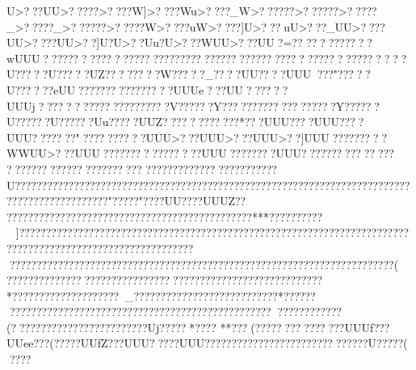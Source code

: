 {{{{{{{{{{{{{{{{{{{{{{{{{{{{{{{{{{{{{{{{{{{{{{{{{{{{{{{{{{{{{{{{{{{{{{{{{{{{{{{{{{{{{{{{{{{{{{{{{{{{{{{{{{{{{{{{{{{{{{{{{{{{{{{{{{{{{{{{{{{{{{{{{{{{{{{{{{{{{{{{{{{{{{{{{{{{{{{{{{{{{{{{{{{{{{{{{{{{{{{{{{{{{{{{{{{{{{{{{{{{{{{{{{{{{{{{{{{{{{{{{{{{{{{{{{{{{{{{{{{{{{{{{{{{{{{{{{{{{{{{{{{{{{{{{{{{{{{{{{{{{{{{{{{{{{{{{{{{{{{{{{{{{{{{{{{{{{{{{{{{{{{{{{{{{{{{{{{{{{{{{{{{{{{{{{{{{{{{{{{{{{{{{{{{{{{{{{{{{{{{{{{{{{{{{{{{{{{{{{{{{{{{{{{{{{{{{{{{{{{{{{{{{{{{{{{{{{{{{{{{{{{{{{{{{{{{{{{{{{{{{{{{{{{{{{{{{{{{{{{{{{{{{{{{{{{{{{{{{{{{{{{{{{{{{{{{{{{{{{{{{{{{{{{{{{{{{{{{{{{{{{{{{{{{{{{{{{{{{{{{{{{{{{{{{{{{{{{{{{{{{{{{{{{{{{{{{{{{{{{{{{{{{{{{{{{{{{{{{{{{{{{{{{{{{{{{{{{{{{{{{{{{{{{{{{{{{{{{{{{{{{{{{{{{{{{{{{{{{{{{{{{{{{{{{{{{{{{{{{{{{{{{{{{{{{{{{{{{{{{{{{{{{{{{{{{{{{{{{{{{{{{{{{{{{{{{{{{{{{{{{{{{{{{{{{{{{{{{{{{{{{{{{{{{{{{{{{{{{{{{{{{{{{{{{{{{{{{{{{{{{{{{{{{{{{{{{{{{{{{{{{{{{{{{{{{{{{{{{{{{{{{{{{{{{{{{{{{{{{{{{{{{{{{{{{{{{{{{{{{{{{{{{{{{{{{{{{{{{{{{{{{{{{{{{{{{{{{{{{{{{{{{{{{{{{{{{{{{{{{{{{{{{{{{{{{{{{{{{{{{{{{{{{{{{{{{{{{{{{{{{{{{{{{{{{{{{{{{{{{{{{{{{{{{{{{{{{{{{{{{{{{{{{{{{{{{{{{{{{{{{{{{{{{{{{{{{{{{{{{{{{{{{{{{{{{{{{{{{{{{{{{{{{{{{{{{{{{{{{{{{{{{{{{{{{{{{{{{{{{{{{{{{{{{{{{{{{{{{{{{{{{{{{{{{{{{{{{{{{{{{{{{{{{{{{{{{{{{{{{{{{{{{{{{{{{{{{{{{{{{{{{{{{{{{{{{{{{{{{{{{{{{{{{{{{{{{{{{{{{{{{{{{{{{{{{{{{{{{{{{{{{{{{{{{{{{{{{{{{{{{{{{{{{{{{{{{{{{{{{{{{{{{{{{{{{{{{{{{{{{{{{{{{{{{{{{{{{{{{{{{{{{{{{{{{{{{{{{{{{{{{{{{{{{{{{{{{{{{{{{{{{{{{{{{{{{{{{{{{{{{{{{{{{{{{{{{{{{{{{{{{{{{{{{{{{{{{{{{{{{{{{{{{{{{{{{{{{{{{{{{{{{{{{{{{{{{{{{{{{{{{{{{{{{{{{{{{{{{{{{{{{{{{{{{{{{{{{{{{{{{{{{{{{{{{{{{{{{{{{{{{{{{{{{{{{{{{{{{{{{{{{{{{{{{{{{{{{{{{{{{{{{{{{{{{{{{{{{{{{{{{{{{{{{{{{{{{{{{{{{{{{{{{{{{{{{{{{{{{{{{{{{{{{{{{{{{{{{{{{{{{{{{{{{{{{{{{{{{{{{{{{{{{{{{{{{{{{{{{{{{{{{{{{{{{{{{{{{{{{{{{{{{{{{{{{{{{{{{{{{{{{{{{{{{{{{{{{{{{{{{{{{{{{{{{{{{{{{{{{{{{{{{{{{{{{{{{{{{{{{{{{{{U>??}?UU>????}?>????W]>????Wu>????_W>??????>??????>?????_>?????_>??????>?????W>????uW>????]U>???uU>???_UU>????UU>????UU>??]U?U>??Uu?U>???WUU>???}UU?=?? ??????????wUUU????????????????????????????????????????????????????????    ??U?????U?????UZ??????  ??W?????}_????UU????UUU???"?????U??????eUU????????????????UUUe?? ?UU????  ??UUUj????  ??    ???????????????V??????Y???????????????????Y??????U??????U??????Uu?????UUZ????  ????   ????   *???UUU????UUU????UUU????   ???   "???   ????   ???}UUU>???UUU>???UUU>??]UUU?????????WWUU>???UUU????????????????UUU???  ?????UUU???? ?????? ?????  
???? ?????? ?????????????
????????}????????????????U?????????????????????????????????????????????????????????????????????????????????????????????"????? "????UU????UUUZ??   
??    ????????????????????????????????????????????***??????????]??????????????????????    ??????????????????????????????????????????????????????????????????????????????????????????????????????????????????????????????????????????????????????????????(
??????????????????????????????????????????????????????????
*????????????????????_????    ???????????????????????*???????????????????????????????????????????????????????????????????(?????????????????????????Uj????? *???? 
**???  (????  ????   ????   ???UUUf???UUee???  (?????UUfZ???UUU?????UUU??????????????????????????????U?????(
????   }}}}}}}}}}}}}}}}}}}}}}}}}}}}}}}}}}}}}}}}}}}}}}}}}}}}}}}}}}}}}}}}}}}}}}}}}}}}}}}}}}}}}}}}}}}}}}}}}}}}}}}}}}}}}}}}}}}}}}}}}}}}}}}}}}}}}}}}}}}}}}}}}}}}}}}}}}}}}}}}}}}}}}}}}}}}}}}}}}}}}}}}}}}}}}}}}}}}}}}}}}}}}}}}}}}}}}}}}}}}}}}}}}}}}}}}}}}}}}}}}}}}}}}}}}}}}}}}}}}}}}}}}}}}}}}}}}}}}}}}}}}}}}}}}}}}}}}}}}}}}}}}}}}}}}}}}}}}}}}}}}}}}}}}}}}}}}}}}}}}}}}}}}}}}}}}}}}}}}}}}}}}}}}}}}}}}}}}}}}}}}}}}}}}}}}}}}}}}}}}}}}}}}}}}}}}}}}}}}}}}}}}}}}}}}}}}}}}}}}}}}}}}}}}}}}}}}}}}}}}}}}}}}}}}}}}}}}}}}}}}}}}}}}}}}}}}}}}}}}}}}}}}}}}}}}}}}}}}}}}}}}}}}}}}}}}}}}}}}}}}}}}}}}}}}}}}}}}}}}}}}}}}}}}}}}}}}}}}}}}}}}}}}}}}}}}}}}}}}}}}}}}}}}}}}}}}}}}}}}}}}}}}}}}}}}}}}}}}}}}}}}}}}}}}}}}}}}}}}}}}}}}}}}}}}}}}}}}}}}}}}}}}}}}}}}}}}}}}}}}}}}}}}}}}}}}}}}}}}}}}}}}}}}}}}}}}}}}}}}}}}}}}}}}}}}}}}}}}}}}}}}}}}}}}}}}}}}}}}}}}}}}}}}}}}}}}}}}}}}}}}}}}}}}}}}}}}}}}}}}}}}}}}}}}}}}}}}}}}}}}}}}}}}}}}}}}}}}}}}}}}}}}}}}}}}}}}}}}}}}}}}}}}}}}}}}}}}}}}}}}}}}}}}}}}}}}}}}}}}}}}}}}}}}}}}}}}}}}}}}}}}}}}}}}}}}}}}}}}}}}}}}}}}}}}}}}}}}}}}}}}}}}}}}}}}}}}}}}}}}}}}}}}}}}}}}}}}}}}}}}}}}}}}}}}}}}}}}}}}}}}}}}}}}}}}}}}}}}}}}}}}}}}}}}}}}}}}}}}}}}}}}}}}}}}}}}}}}}}}}}}}}}}}}}}}}}}}}}}}}}}}}}}}}}}}}}}}}}}}}}}}}}}}}}}}}}}}}}}}}}}}}}}}}}}}}}}}}}}}}}}}}}}}}}}}}}}}}}}}}}}}}}}}}}}}}}}}}}}}}}}}}}}}}}}}}}}}}}}}}}}}}}}}}}}}}}}}}}}}}}}}}}}}}}}}}}}}}}}}}}}}}}}}}}}}}}}}}}}}}}}}}}}}}}}}}}}}}}}}}}}}}}}}}}}}}}}}}}}}}}}}}}}}}}}}}}}}}}}}}}}}}}}}}}}}}}}}}}}}}}}}}}}}}}}}}}}}}}}}}}}}}}}}}}}}}}}}}}}}}}}}}}}}}}}}}}}}}}}}}}}}}}}}}}}}}}}}}}}}}}}}}}}}}}}}}}}}}}}}}}}}}}}}}}}}}}}}}}}}}}}}}}}}}}}}}}}}}}}}}}}}}}}}}}}}}}}}}}}}}}}}}}}}}}}}}}}}}}}}}}}}}}}}}}}}}}}}}}}}}}}}}}}}}}}}}}}}}}}}}}}}}}}}}}}}}}}}}}}}}}}}}}}}}}}}}}}}}}}}}}}}}}}}}}}}}}}}}}}}}}}}}}}}}}}}}}}}}}}}}}}}}}}}}}}}}}}}}}}}}}}}}}}}}}}}}}}}}}}}}}}}}}}}}}}}}}}}}}}}}}}}}}}}}}}}}}}}}}}}}}}}}}}}}}}}}}}}}}}}}}}}}}}}}}}}}}}}}}}}}}}}}}}}}}}}}}}}}}}}}}}}}}}}}}}}}}}}}}}}
